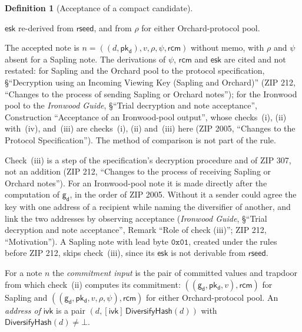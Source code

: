\documentclass[11pt,a4paper]{article}
\theoremstyle{definition}
\newtheorem{definition}[theorem]{Definition}
\newcommand{\ivk}{\ensuremath{\mathsf{ivk}}}
\newcommand{\pkd}{\ensuremath{\mathsf{pk_d}}}
\newcommand{\gd}{\ensuremath{\mathsf{g_d}}}
\newcommand{\rcm}{\ensuremath{\mathsf{rcm}}}
\begin{document}
\begin{definition}[Acceptance of a compact candidate]
\begin{enumerate}[label=(\roman*)]
  $\mathsf{esk}$ re-derived from $\mathsf{rseed}$, and from $\rho$ for
  either Orchard-protocol pool.
\end{enumerate}
The accepted note is $n = ((d, \pkd), v, \rho, \psi, \rcm)$ without memo,
with $\rho$ and $\psi$ absent for a Sapling note. The derivations of $\psi$,
$\rcm$ and $\mathsf{esk}$ are cited and not restated: for Sapling and
the Orchard pool to the protocol specification, \S``Decryption using an
Incoming Viewing Key (Sapling and Orchard)'' (ZIP 212, ``Changes to the
process of sending Sapling or Orchard notes''); for the Ironwood pool to the
\emph{Ironwood Guide}, \S``Trial decryption and note acceptance'', Construction
``Acceptance of an Ironwood-pool output'', whose checks~(i), (ii) with~(iv),
and~(iii) are checks~(i), (ii) and~(iii) here (ZIP 2005, ``Changes to the
Protocol Specification''). The method of comparison is not part of the rule.
\end{definition}

Check~(iii) is a step of the specification's decryption procedure and of
ZIP 307, not an addition (ZIP 212, ``Changes to the process of receiving
Sapling or Orchard notes''). For an Ironwood-pool note it is made directly
after the computation of $\gd$, in the order of ZIP 2005. Without it a
sender could agree the key with one address of a recipient while naming
the diversifier of another, and link the two addresses by observing
acceptance (\emph{Ironwood Guide}, \S``Trial decryption and note acceptance'',
Remark ``Role of check (iii)''; ZIP 212, ``Motivation''). A Sapling note with
lead byte $\mathtt{0x01}$, created under the rules before ZIP 212, skips
check~(iii), since its $\mathsf{esk}$ is not derivable from $\mathsf{rseed}$.

For a note $n$ the \emph{commitment input} is the pair of committed values
and trapdoor from which check~(ii) computes its commitment:
$((\gd, \pkd, v), \rcm)$ for Sapling and $((\gd, \pkd, v, \rho, \psi),
\rcm)$ for either Orchard-protocol pool. An \emph{address of} $\ivk$ is a
pair $(d, [\ivk]\,\mathsf{DiversifyHash}(d))$ with
$\mathsf{DiversifyHash}(d) \neq \bot$.
\end{document}
